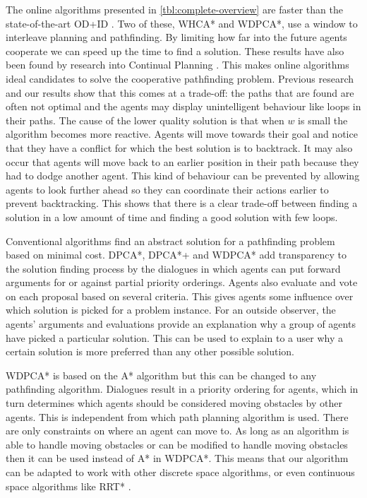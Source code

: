 The online algorithms presented in \autoref{tbl:complete-overview} are faster 
than the state-of-the-art OD+ID \cite{standley2010,wei2016}. Two of these, 
WHCA* and WDPCA*, use a window to interleave planning and pathfinding. By 
limiting how far into the future agents cooperate we can speed up the time to 
find a solution. These results have also been found by research into Continual 
Planning \cite{brenner2009}. This makes online algorithms ideal candidates to 
solve the cooperative pathfinding problem. Previous research and our results 
show that this comes at a trade-off: the paths that are found are often not 
optimal and the agents may display unintelligent behaviour like loops in their 
paths. The cause of the lower quality solution is that when $w$ is small the 
algorithm becomes more reactive. Agents will move towards their goal and notice 
that they have a conflict for which the best solution is to backtrack. It may 
also occur that agents will move back to an earlier position in their path 
because they had to dodge another agent. This kind of behaviour can be 
prevented by allowing agents to look further ahead so they can coordinate their 
actions earlier to prevent backtracking. This shows that there is a clear 
trade-off between finding a solution in a low amount of time and finding a good 
solution with few loops.

Conventional algorithms find an abstract solution for a pathfinding problem 
based on minimal cost. DPCA*, DPCA*+ and WDPCA* add transparency to the 
solution finding process by the dialogues in which agents can put forward 
arguments for or against partial priority orderings. Agents also evaluate and 
vote on each proposal based on several criteria. This gives agents some 
influence over which solution is picked for a problem instance. For an outside 
observer, the agents' arguments and evaluations provide an explanation why a 
group of agents have picked a particular solution. This can be used to explain 
to a user why a certain solution is more preferred than any other possible 
solution.

WDPCA* is based on the A* algorithm \cite{hart1968} but this can be changed to
any pathfinding algorithm. Dialogues result in a priority ordering for agents,
which in turn determines which agents should be considered moving obstacles by
other agents. This is independent from which path planning algorithm is used.
There are only constraints on where an agent can move to. As long as an
algorithm
is able to handle moving obstacles or can be modified to handle moving
obstacles then it can be used instead of A* in WDPCA*. This means that our
algorithm can be adapted to work with other discrete space algorithms, or even
continuous space algorithms like RRT* \cite{lavalle1998,lavalle2001,cap2013}.

